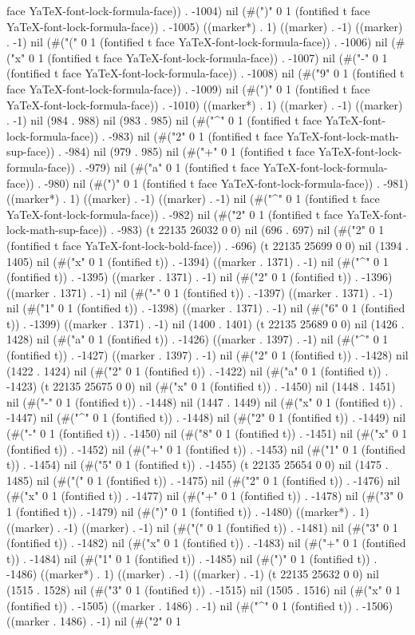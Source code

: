 face YaTeX-font-lock-formula-face)) . -1004) nil (#(")" 0 1 (fontified t face YaTeX-font-lock-formula-face)) . -1005) ((marker*) . 1) ((marker) . -1) ((marker) . -1) nil (#("(" 0 1 (fontified t face YaTeX-font-lock-formula-face)) . -1006) nil (#("x" 0 1 (fontified t face YaTeX-font-lock-formula-face)) . -1007) nil (#("-" 0 1 (fontified t face YaTeX-font-lock-formula-face)) . -1008) nil (#("9" 0 1 (fontified t face YaTeX-font-lock-formula-face)) . -1009) nil (#(")" 0 1 (fontified t face YaTeX-font-lock-formula-face)) . -1010) ((marker*) . 1) ((marker) . -1) ((marker) . -1) nil (984 . 988) nil (983 . 985) nil (#("^" 0 1 (fontified t face YaTeX-font-lock-formula-face)) . -983) nil (#("2" 0 1 (fontified t face YaTeX-font-lock-math-sup-face)) . -984) nil (979 . 985) nil (#("+" 0 1 (fontified t face YaTeX-font-lock-formula-face)) . -979) nil (#("a" 0 1 (fontified t face YaTeX-font-lock-formula-face)) . -980) nil (#(")" 0 1 (fontified t face YaTeX-font-lock-formula-face)) . -981) ((marker*) . 1) ((marker) . -1) ((marker) . -1) nil (#("^" 0 1 (fontified t face YaTeX-font-lock-formula-face)) . -982) nil (#("2" 0 1 (fontified t face YaTeX-font-lock-math-sup-face)) . -983) (t 22135 26032 0 0) nil (696 . 697) nil (#("2" 0 1 (fontified t face YaTeX-font-lock-bold-face)) . -696) (t 22135 25699 0 0) nil (1394 . 1405) nil (#("x" 0 1 (fontified t)) . -1394) ((marker . 1371) . -1) nil (#("^" 0 1 (fontified t)) . -1395) ((marker . 1371) . -1) nil (#("2" 0 1 (fontified t)) . -1396) ((marker . 1371) . -1) nil (#("-" 0 1 (fontified t)) . -1397) ((marker . 1371) . -1) nil (#("1" 0 1 (fontified t)) . -1398) ((marker . 1371) . -1) nil (#("6" 0 1 (fontified t)) . -1399) ((marker . 1371) . -1) nil (1400 . 1401) (t 22135 25689 0 0) nil (1426 . 1428) nil (#("a" 0 1 (fontified t)) . -1426) ((marker . 1397) . -1) nil (#("^" 0 1 (fontified t)) . -1427) ((marker . 1397) . -1) nil (#("2" 0 1 (fontified t)) . -1428) nil (1422 . 1424) nil (#("2" 0 1 (fontified t)) . -1422) nil (#("a" 0 1 (fontified t)) . -1423) (t 22135 25675 0 0) nil (#("x" 0 1 (fontified t)) . -1450) nil (1448 . 1451) nil (#("-" 0 1 (fontified t)) . -1448) nil (1447 . 1449) nil (#("x" 0 1 (fontified t)) . -1447) nil (#("^" 0 1 (fontified t)) . -1448) nil (#("2" 0 1 (fontified t)) . -1449) nil (#("-" 0 1 (fontified t)) . -1450) nil (#("8" 0 1 (fontified t)) . -1451) nil (#("x" 0 1 (fontified t)) . -1452) nil (#("+" 0 1 (fontified t)) . -1453) nil (#("1" 0 1 (fontified t)) . -1454) nil (#("5" 0 1 (fontified t)) . -1455) (t 22135 25654 0 0) nil (1475 . 1485) nil (#("(" 0 1 (fontified t)) . -1475) nil (#("2" 0 1 (fontified t)) . -1476) nil (#("x" 0 1 (fontified t)) . -1477) nil (#("+" 0 1 (fontified t)) . -1478) nil (#("3" 0 1 (fontified t)) . -1479) nil (#(")" 0 1 (fontified t)) . -1480) ((marker*) . 1) ((marker) . -1) ((marker) . -1) nil (#("(" 0 1 (fontified t)) . -1481) nil (#("3" 0 1 (fontified t)) . -1482) nil (#("x" 0 1 (fontified t)) . -1483) nil (#("+" 0 1 (fontified t)) . -1484) nil (#("1" 0 1 (fontified t)) . -1485) nil (#(")" 0 1 (fontified t)) . -1486) ((marker*) . 1) ((marker) . -1) ((marker) . -1) (t 22135 25632 0 0) nil (1515 . 1528) nil (#("3" 0 1 (fontified t)) . -1515) nil (1505 . 1516) nil (#("x" 0 1 (fontified t)) . -1505) ((marker . 1486) . -1) nil (#("^" 0 1 (fontified t)) . -1506) ((marker . 1486) . -1) nil (#("2" 0 1 